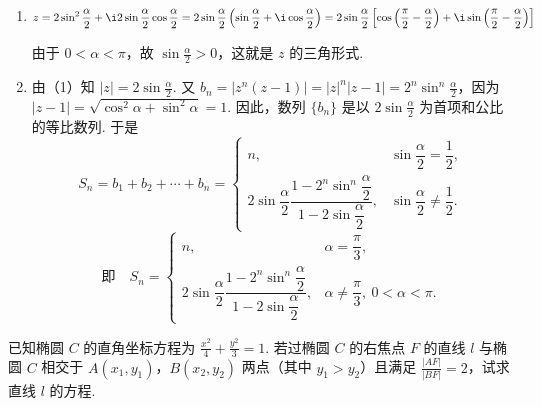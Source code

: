 \documentclass[UTF8,a4paper,oneside,11pt]{ctexbook}
\begin{document}
\begin{solution}
\begin{enumerate}
\item
\[
z=2\sin^2\frac{\alpha}{2}+\i 2\sin\frac{\alpha}{2}\cos\frac{\alpha}{2}=2\sin\frac{\alpha}{2}\left(\sin\frac{\alpha}{2}+\i\cos\frac{\alpha}{2}\right)=2\sin\frac{\alpha}{2}\left[\cos\left(\frac{\pi}{2}-\frac{\alpha}{2}\right)+\i\sin\left(\frac{\pi}{2}-\frac{\alpha}{2}\right)\right]
\]

由于 \(0<\alpha<\pi\)，故 \(\sin\frac{\alpha}{2}>0\)，这就是 \(z\) 的三角形式.

\item 由（1）知 \(|z|=2\sin\frac{\alpha}{2}\). 又 \(b_n=|z^n(z-1)|=|z|^n|z-1|=2^n\sin^n\frac{\alpha}{2}\)，因为 \(|z-1|=\sqrt{\cos^2\alpha+\sin^2\alpha}=1\). 因此，数列 \(\{b_n\}\) 是以 \(2\sin\frac{\alpha}{2}\) 为首项和公比的等比数列. 于是
\[
S_n=b_1+b_2+\cdots+b_n=
\begin{cases}
n, & \sin\dfrac{\alpha}{2}=\dfrac{1}{2},\\[4pt]
2\sin\dfrac{\alpha}{2}\dfrac{1-2^n\sin^n\dfrac{\alpha}{2}}{1-2\sin\dfrac{\alpha}{2}}, & \sin\dfrac{\alpha}{2}\ne\dfrac{1}{2}.
\end{cases}
\]
\[
\text{即}\quad S_n=
\begin{cases}
n, & \alpha=\dfrac{\pi}{3},\\[4pt]
2\sin\dfrac{\alpha}{2}\dfrac{1-2^n\sin^n\dfrac{\alpha}{2}}{1-2\sin\dfrac{\alpha}{2}}, & \alpha\ne\dfrac{\pi}{3},\ 0<\alpha<\pi.
\end{cases}
\]
\end{enumerate}

\end{solution}


\begin{problem}

已知椭圆 \(C\) 的直角坐标方程为 \(\frac{x^2}{4} + \frac{y^2}{3} = 1\). 若过椭圆 \(C\) 的右焦点 \(F\) 的直线 \(l\) 与椭圆 \(C\) 相交于 \(A(x_1, y_1)\)，\(B(x_2, y_2)\) 两点（其中 \(y_1 > y_2\)）且满足 \(\frac{|AF|}{|BF|} = 2\)，试求直线 \(l\) 的方程.
\end{problem}
\end{document}
